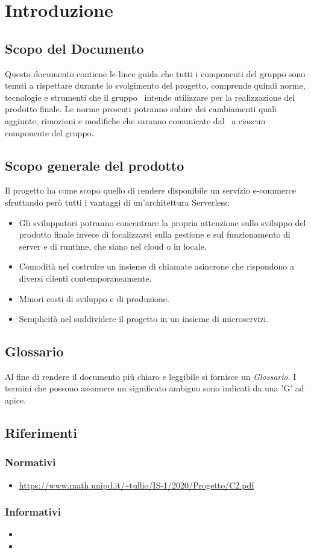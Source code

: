 \section{Introduzione}\label{Introduzione}
\subsection{Scopo del Documento}\label{ScopoDocumento}
Questo documento contiene le linee guida che tutti i componenti del gruppo sono tenuti a rispettare durante lo svolgimento del progetto, comprende quindi norme, tecnologie e strumenti che il gruppo \Gruppo\ intende utilizzare per la realizzazione del prodotto finale. 
Le norme presenti potranno subire dei cambiamenti quali aggiunte, rimozioni e modifiche che saranno comunicate dal \Responsabile\ a ciascun componente del gruppo.

\subsection{Scopo generale del prodotto}
Il progetto {\NomeProgetto} ha come scopo quello di rendere disponibile un servizio e-commerce sfruttando però tutti i vantaggi di un'architettura Serverless:
\begin{itemize}
    \item Gli sviluppatori potranno concentrare la propria attenzione sullo sviluppo del prodotto finale invece di focalizzarsi sulla gestione e sul funzionamento di server e di runtime, che siano nel cloud o in locale.
    \item Comodità nel costruire un insieme di chiamate asincrone che rispondono a diversi clienti contemporaneamente.
    \item Minori costi di sviluppo e di produzione.
    \item Semplicità nel suddividere il progetto in un insieme di microservizi.
\end{itemize}

\subsection{Glossario}\label{Glossario}
Al fine di rendere il documento più chiaro e leggibile si fornisce un \textit{Glossario}. I termini che possono assumere un significato ambiguo sono indicati da una 'G' ad apice.

\subsection{Riferimenti}
\subsubsection{Normativi}\label{RiferimentiNormativi}
\begin{itemize}
\item \url{https://www.math.unipd.it/~tullio/IS-1/2020/Progetto/C2.pdf}
\end{itemize}

\subsubsection{Informativi}
\begin{itemize}
\item \PdPv{}
\item \PdQv{}
\end{itemize}
